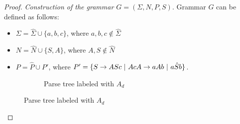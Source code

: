 \documentclass[11pt,a4paper]{article} %
\begin{document}
\begin{proof}
\textit{Construction of the grammar $G = (\Sigma, N, P, S)$}. Grammar $G$ can be defined as follows:
\begin{itemize}
\item $\Sigma = \hat{\Sigma} \cup \{a, b, c\}$, where $a, b, c \not\in  \hat{\Sigma}$
\item $N = \hat{N} \cup \{S, A\}$, where $A, S \not\in  \hat{N}$
\item $P =\hat{P} \cup P'$, where $P' = 
\{ 
\\ S \rightarrow A S c\ \vert \ A c
\\ A \rightarrow a A b\ \vert \ a \hat{S}  b
\\  \}$. 

\end{itemize}


\begin{figure}[h]
\centering
\begin{subfigure}{.5\textwidth}
  \centering
  \begin{minipage}[m]{0.7\linewidth}
  \end{minipage}\hfill
  \caption{Parse tree labeled with $A_d$}
  \label{dimsubtree:1}
\end{subfigure}%

\end{figure}
\end{proof}
\end{document}
